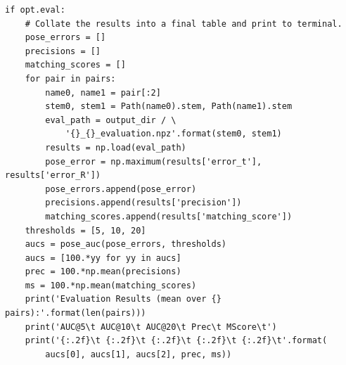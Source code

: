 \documentclass[letterpaper,12pt]{article}
\begin{document}
\begin{lstlisting}[caption={Sample Code Snippet for Evaluation},captionpos=b]
if opt.eval:
    # Collate the results into a final table and print to terminal.
    pose_errors = []
    precisions = []
    matching_scores = []
    for pair in pairs:
        name0, name1 = pair[:2]
        stem0, stem1 = Path(name0).stem, Path(name1).stem
        eval_path = output_dir / \
            '{}_{}_evaluation.npz'.format(stem0, stem1)
        results = np.load(eval_path)
        pose_error = np.maximum(results['error_t'], results['error_R'])
        pose_errors.append(pose_error)
        precisions.append(results['precision'])
        matching_scores.append(results['matching_score'])
    thresholds = [5, 10, 20]
    aucs = pose_auc(pose_errors, thresholds)
    aucs = [100.*yy for yy in aucs]
    prec = 100.*np.mean(precisions)
    ms = 100.*np.mean(matching_scores)
    print('Evaluation Results (mean over {} pairs):'.format(len(pairs)))
    print('AUC@5\t AUC@10\t AUC@20\t Prec\t MScore\t')
    print('{:.2f}\t {:.2f}\t {:.2f}\t {:.2f}\t {:.2f}\t'.format(
        aucs[0], aucs[1], aucs[2], prec, ms))
\end{lstlisting}
\end{document}
